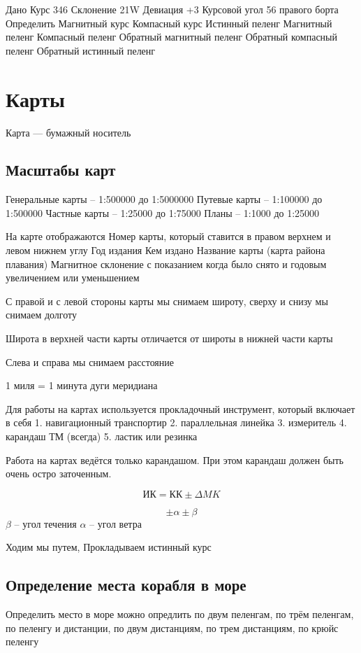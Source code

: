 \documentclass{article}        %
\begin{document}
Дано
Курс 346\degree
Склонение 21\degree W
Девиация +3\degree 
Курсовой угол 56 \degree правого борта
Определить
	Магнитный курс
	Компасный курс
	Истинный пеленг
	Магнитный пеленг
	Компасный пеленг
	Обратный магнитный пеленг
	Обратный компасный пеленг
	Обратный истинный пеленг

\section{Карты}
Карта --- бумажный носитель

\subsection{Масштабы карт}
Генеральные карты -- 1:500000 до 1:5000000
Путевые карты -- 1:100000 до 1:500000
Частные карты -- 1:25000 до 1:75000
Планы -- 1:1000 до 1:25000

На карте отображаются
	Номер карты, который ставится в правом верхнем и левом нижнем углу
	Год издания
	Кем издано
	Название карты (карта района плавания)
	Магнитное склонение с показанием когда было снято 
		и годовым увеличением или уменьшением

С правой и с левой стороны карты мы снимаем широту, сверху и снизу мы снимаем долготу	

Широта в верхней части карты отличается 
от широты в нижней части карты

Слева и справа мы снимаем расстояние

1 миля = 1 минута дуги меридиана

Для работы на картах используется прокладочный инструмент, который включает в себя
1. навигационный транспортир
2. параллельная линейка
3. измеритель
4. карандаш ТМ (всегда)
5. ластик или резинка

Работа на картах ведётся только карандашом. При этом карандаш должен быть очень остро заточенным.

$$ИК = КК \pm \Delta MK$$

$$\pm\alpha \pm\beta$$
$\beta$
-- угол течения
$\alpha$
-- угол ветра

Ходим мы путем, Прокладываем истинный курс



\subsection{Определение места корабля в море}
Определить место в море можно опредлить по двум пеленгам, по трём пеленгам, 
по пеленгу и дистанции, по двум дистанциям, по трем дистанциям, 
по крюйс пеленгу
\end{document}
